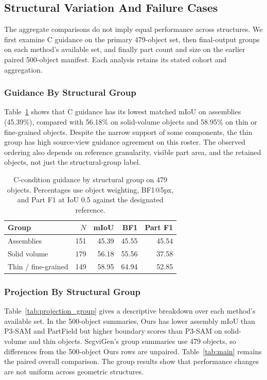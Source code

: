 \documentclass[pdflatex,iicol,sn-apa]{sn-jnl}
\begin{document}
\subsection{Structural Variation And Failure Cases}
\label{sec:structural_analysis}

The aggregate comparisons do not imply equal performance across structures. We first examine C guidance on the primary 479-object set, then final-output groups on each method's available set, and finally part count and size on the earlier paired 500-object manifest. Each analysis retains its stated cohort and aggregation.

\subsubsection{Guidance By Structural Group}

Table~\ref{tab:guidance_group} shows that C guidance has its lowest matched mIoU on assemblies (45.39\%), compared with 56.18\% on solid-volume objects and 58.95\% on thin or fine-grained objects. Despite the narrow support of some components, the thin group has high source-view guidance agreement on this roster. The observed ordering also depends on reference granularity, visible part area, and the retained objects, not just the structural-group label.

\begin{table}[t]
\caption{C-condition guidance by structural group on 479 objects. Percentages use object weighting, BF1@5px, and Part F1 at IoU 0.5 against the designated reference.}
\label{tab:guidance_group}
\centering\small
\begin{tabular}{@{}lrrrr@{}}
\toprule
Group & $N$ & mIoU & BF1 & Part F1\\
\midrule
Assemblies & 151 & 45.39 & 45.55 & 45.54\\
Solid volume & 179 & 56.18 & 55.56 & 37.58\\
Thin / fine-grained & 149 & 58.95 & 64.94 & 52.85\\
\bottomrule
\end{tabular}
\end{table}

\subsubsection{Projection By Structural Group}
\label{sec:projection_groups}

Table~\ref{tab:projection_group} gives a descriptive breakdown over each method's available set. In the 500-object summaries, Ours has lower assembly mIoU than P3-SAM and PartField but higher boundary scores than P3-SAM on solid-volume and thin objects. SegviGen's group summaries use 479 objects, so differences from the 500-object Ours rows are unpaired. Table~\ref{tab:main} remains the paired overall comparison. The group results show that performance changes are not uniform across geometric structures.
\end{document}
